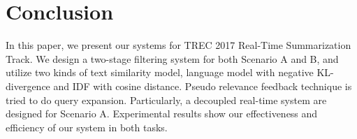 \section{Conclusion}
In this paper, we present our systems for TREC 2017 Real-Time Summarization Track.
We design a two-stage filtering system for both Scenario A and B, 
and utilize two kinds of text similarity model, 
language model with negative KL-divergence and IDF with cosine distance.
Pseudo relevance feedback technique is tried to do query expansion.
Particularly, a decoupled real-time system are designed for Scenario A.
Experimental results show our effectiveness and efficiency of our system in both tasks.


